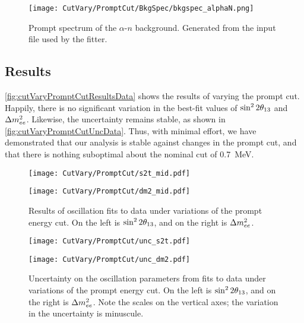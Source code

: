 \documentclass[../thesis.tex]{subfiles}
\begin{document}
\begin{figure}[h]
  \texttt{[image: CutVary/PromptCut/BkgSpec/bkgspec\_alphaN.png]}
  \caption{Prompt spectrum of the $\alpha$-$n$ background. Generated from the input file used by the fitter.}
  \label{fig:bkgspec_alphaN}
\end{figure}

\subsection{Results}
\label{sec:cutVaryPromptCutResults}


\autoref{fig:cutVaryPromptCutResultsData} shows the results of varying the prompt cut. Happily, there is no significant variation in the best-fit values of $\sin^2 2\theta_{13}$ and $\Delta m^2_{ee}$. Likewise, the uncertainty remains stable, as shown in \autoref{fig:cutVaryPromptCutUncData}. Thus, with minimal effort, we have demonstrated that our analysis is stable against changes in the prompt cut, and that there is nothing suboptimal about the nominal cut of 0.7~MeV.

\begin{figure}[ht]
  \begin{minipage}{0.47\linewidth}%
    \texttt{[image: CutVary/PromptCut/s2t\_mid.pdf]}%
  \end{minipage}%
  \begin{minipage}{0.47\linewidth}%
    \texttt{[image: CutVary/PromptCut/dm2\_mid.pdf]}%
  \end{minipage}%
  \caption{Results of oscillation fits to data under variations of the prompt energy cut. On the left is $\sin^2 2\theta_{13}$, and on the right is $\Delta m^2_{ee}$.}
  \label{fig:cutVaryPromptCutResultsData}
\end{figure}

\begin{figure}[ht]
  \begin{minipage}{0.47\linewidth}%
    \texttt{[image: CutVary/PromptCut/unc\_s2t.pdf]}%
  \end{minipage}%
  \begin{minipage}{0.47\linewidth}%
    \texttt{[image: CutVary/PromptCut/unc\_dm2.pdf]}%
  \end{minipage}%
  \caption{Uncertainty on the oscillation parameters from fits to data under variations of the prompt energy cut. On the left is $\sin^2 2\theta_{13}$, and on the right is $\Delta m^2_{ee}$. Note the scales on the vertical axes; the variation in the uncertainty is minuscule.}
  \label{fig:cutVaryPromptCutUncData}
\end{figure}
\end{document}

